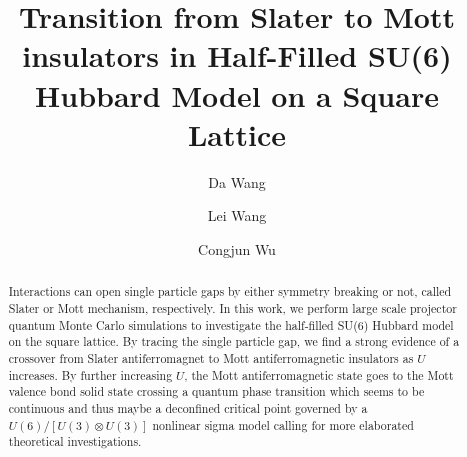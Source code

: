 \documentclass[twocolumn,superscriptaddress,prb]{revtex4-1}
\begin{document}
\title{Transition from Slater to Mott insulators in Half-Filled SU(6) Hubbard Model on a Square Lattice}
\author{Da Wang} %
\author{Lei Wang} %
\author{Congjun Wu} %
\begin{abstract}
    Interactions can open single particle gaps by either symmetry breaking or not, called Slater or Mott mechanism, respectively. In this work, we perform large scale projector quantum Monte Carlo simulations to investigate the half-filled SU(6) Hubbard model on the square lattice. By tracing the single particle gap, we find a strong evidence of a crossover from Slater antiferromagnet to Mott antiferromagnetic insulators as $U$ increases. By further increasing $U$, the Mott antiferromagnetic state goes to the Mott valence bond solid state crossing a quantum phase transition which seems to be continuous and thus maybe a deconfined critical point governed by a $U(6)/[U(3)\otimes U(3)]$ nonlinear sigma model calling for more elaborated theoretical investigations. 
\end{abstract}
\maketitle
\end{document}

